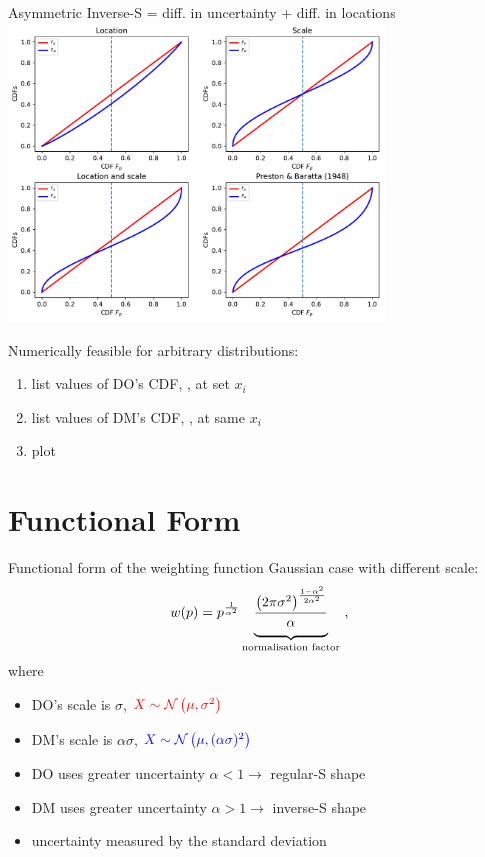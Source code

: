\begin{frame}{Asymmetric Inverse-S = diff. in uncertainty + diff. in locations}
\centering
	\includegraphics[width=0.75\textwidth]{../figs/Gauss_scale_location_both_KT.pdf}
	\label{LocationScale}
\end{frame}

\begin{frame}
Numerically feasible for arbitrary distributions:
\begin{enumerate}
	\item list values of DO's CDF, , at set ${x_i}$
	\item list values of DM's CDF, , at same ${x_i}$
	\item plot  \vs {}
\end{enumerate}
\end{frame}

\section{Functional Form}
\begin{frame}{Functional form of the weighting function}
Gaussian case with different scale:
\begin{equation}
\nonumber
	w(p) =
	p^{\frac{1}{\alpha^2}}
	\underbrace{
	\frac{\left(2\pi\sigma^2\right)^{\frac{1-\alpha^2}{2\alpha^2}}}{\alpha\strut}
	}_{\text{normalisation factor}}
	~,
\end{equation}
where
\begin{itemize}
  \item DO's scale is $\sigma$, $\textcolor{red}{X \sim \mathcal{N}\left(\mu,\sigma^2\right)}$
  \item DM's scale is $\alpha\sigma$, $\textcolor{blue}{X \sim \mathcal{N}\left(\mu,(\alpha\sigma)^2\right)}$
  \item DO uses greater uncertainty $\alpha < 1 \to$ regular-S shape
  \item DM uses greater uncertainty $\alpha > 1 \to	$ inverse-S shape
  \item uncertainty measured by the standard deviation
\end{itemize}
\end{frame}

